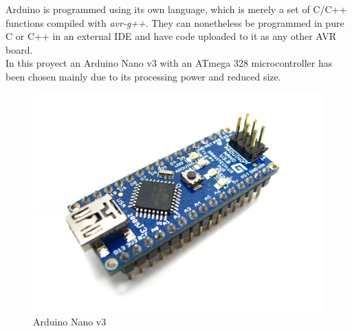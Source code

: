 	Arduino is programmed using its own language, which is merely a set of C/C++ functions compiled with \textit{avr-g++}. They can nonetheless be programmed in pure C or C++ in an external IDE and have code uploaded to it as any other AVR board.\\

	In this proyect an Arduino Nano v3 with an ATmega 328 microcontroller has been chosen mainly due to its processing power and reduced size.
		
		\begin{figure}[H]
			\centering
			\includegraphics[scale=0.4]{images/ProjectComponents/arduino.jpg}
			\caption{Arduino Nano v3 }
			\label{}
		\end{figure}
		\bigskip

